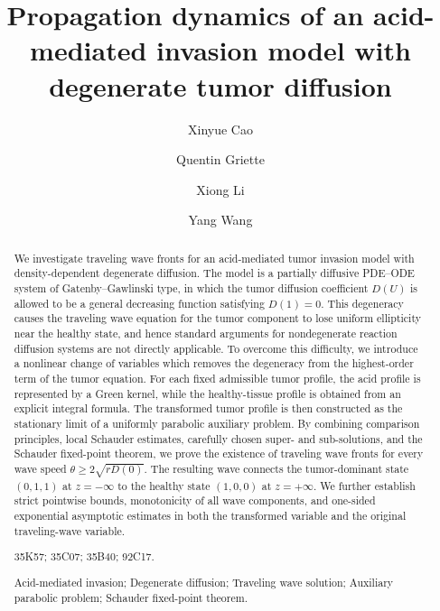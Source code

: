 \documentclass[preprint,sort&compress,final,12pt]{elsarticle}
\date{}
\numberwithin{equation}{section}
\begin{document}
\begin{frontmatter}
\title{Propagation dynamics of an acid-mediated invasion model with degenerate tumor diffusion}

\author[au1]{Xinyue Cao}
\address[au1]{School of Mathematical Sciences, Beijing Normal University and Laboratory of Mathematics and Complex Systems, Ministry of Education, Beijing 100875, China}

\author[au2]{Quentin Griette}
\address[au2]{Universit\'{e} Le Havre Normandie, Normandie Univ., LMAH UR 3821, 76600 Le Havre, France.}

\author[au1]{Xiong Li}

\author[au3,au4]{Yang Wang}
\address[au3]{School of Mathematics and Statistics, Shanxi University, Taiyuan, Shanxi 030006, China}
\address[au4]{Key Laboratory of Complex Systems and Data Science of Ministry of Education, Shanxi University, Taiyuan, Shanxi 030006, China}

\begin{abstract}
We investigate traveling wave fronts for an acid-mediated tumor invasion model with density-dependent degenerate diffusion. The model is a partially diffusive PDE--ODE system of Gatenby--Gawlinski type, in which the tumor diffusion coefficient $D(U)$ is allowed to be a general decreasing function satisfying $D(1)=0$. This degeneracy causes the traveling wave equation for the tumor component to lose uniform ellipticity near the healthy state, and hence standard arguments for nondegenerate reaction diffusion systems are not directly applicable. To overcome this difficulty, we introduce a nonlinear change of variables which removes the degeneracy from the highest-order term of the tumor equation.  For each fixed admissible tumor profile, the acid profile is represented by a Green kernel, while the healthy-tissue profile is obtained from an explicit integral formula. The transformed tumor profile is then constructed as the stationary limit of a uniformly parabolic auxiliary problem. By combining comparison principles, local Schauder estimates, carefully chosen super- and sub-solutions, and the Schauder fixed-point theorem, we prove the existence of traveling wave fronts for every wave speed
$\theta\ge 2\sqrt{rD(0)}$. The resulting wave connects the tumor-dominant state $(0,1,1)$ at $z=-\infty$ to the healthy state $(1,0,0)$ at $z=+\infty$. We further establish strict pointwise bounds, monotonicity of all wave components, and one-sided exponential asymptotic estimates in both the transformed variable and the original traveling-wave variable.

\vspace{0.2cm}
 35K57; 35C07; 35B40; 92C17.

\vspace{0.2cm}
 Acid-mediated invasion; Degenerate diffusion; Traveling wave solution; Auxiliary parabolic problem; Schauder fixed-point theorem.
\end{abstract}
\end{frontmatter}
\end{document}
